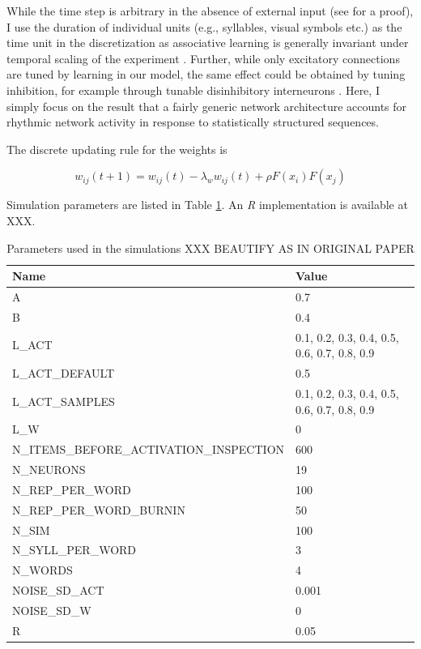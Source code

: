 \documentclass[
]{article}
\begin{document}
While the time step is arbitrary in the absence of external input (see
\citep{Endress-Catastrophic-Interference} for a proof), I use the
duration of individual units (e.g., syllables, visual symbols etc.) as
the time unit in the discretization as associative learning is generally
invariant under temporal scaling of the experiment
\citep{Gallistel2000PsychRev, Gallistel2001b}. Further, while only
excitatory connections are tuned by learning in our model, the same
effect could be obtained by tuning inhibition, for example through
tunable disinhibitory interneurons \citep{Letzkus2011}. Here, I simply
focus on the result that a fairly generic network architecture accounts
for rhythmic network activity in response to statistically structured
sequences.

The discrete updating rule for the weights is

\[
w_{ij} (t+1) = w_{ij} (t) - \lambda_w w_{ij} (t) + \rho F(x_i) F(x_j) 
\]

Simulation parameters are listed in Table \ref{tab:params}. An \emph{R}
implementation is available at XXX.

\begin{table}

\caption{\label{tab:list-parameters2}\label{tab:params}Parameters used in the simulations XXX BEAUTIFY AS IN ORIGINAL PAPER}
\centering
\begin{tabular}[t]{ll}
\toprule
Name & Value\\
\midrule
A & 0.7\\
B & 0.4\\
L\_ACT & 0.1, 0.2, 0.3, 0.4, 0.5, 0.6, 0.7, 0.8, 0.9\\
L\_ACT\_DEFAULT & 0.5\\
L\_ACT\_SAMPLES & 0.1, 0.2, 0.3, 0.4, 0.5, 0.6, 0.7, 0.8, 0.9\\
\addlinespace
L\_W & 0\\
N\_ITEMS\_BEFORE\_ACTIVATION\_INSPECTION & 600\\
N\_NEURONS & 19\\
N\_REP\_PER\_WORD & 100\\
N\_REP\_PER\_WORD\_BURNIN & 50\\
\addlinespace
N\_SIM & 100\\
N\_SYLL\_PER\_WORD & 3\\
N\_WORDS & 4\\
NOISE\_SD\_ACT & 0.001\\
NOISE\_SD\_W & 0\\
\addlinespace
R & 0.05\\
\bottomrule
\end{tabular}
\end{table}
\end{document}
